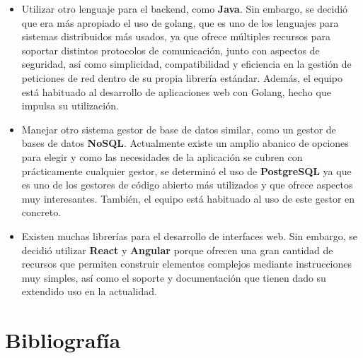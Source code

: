 \documentclass[11pt, a4paper, titlepage]{article}
\begin{document}
\begin{itemize}
    \item Utilizar otro lenguaje para el backend, como \textbf{Java}. Sin embargo, se decidió que era más apropiado el uso de golang, que es uno de los lenguajes para sistemas distribuidos más usados, ya que ofrece múltiples recursos para soportar distintos protocolos de comunicación, junto con aspectos de seguridad, así como simplicidad, compatibilidad y eficiencia en la gestión de peticiones de red dentro de su propia librería estándar. Además, el equipo está habituado al desarrollo de aplicaciones web con Golang, hecho que impulsa su utilización.
    
    \item  Manejar otro sistema gestor de base de datos similar, como un gestor de bases de datos \textbf{NoSQL}. Actualmente existe un amplio abanico de opciones para elegir y como las necesidades de la aplicación se cubren con prácticamente cualquier gestor, se determinó el uso de  \textbf{PostgreSQL} ya que es uno de los gestores de código abierto más utilizados y que ofrece aspectos muy interesantes. También, el equipo está habituado al uso de este gestor en concreto.
    
    \item Existen muchas librerías para el desarrollo de interfaces web. Sin embargo, se decidió utilizar  \textbf{React} y \textbf{Angular} porque ofrecen una gran cantidad de recursos que permiten construir elementos complejos mediante instrucciones muy simples, así como el soporte y documentación que tienen dado su extendido uso en la actualidad.
\end{itemize}




\clearpage

\newpage
\section{Bibliografía}
\printbibliography
\end{document}
